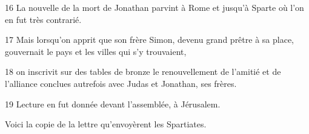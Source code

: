 16 La nouvelle de la mort de Jonathan parvint à Rome et jusqu’à Sparte où l’on en fut très contrarié.

17 Mais lorsqu’on apprit que son frère Simon, devenu grand prêtre à sa place, gouvernait le pays et les villes qui s’y trouvaient,

18 on inscrivit sur des tables de bronze le renouvellement de l’amitié et de l’alliance conclues autrefois avec Judas et Jonathan, ses frères.

19 Lecture en fut donnée devant l’assemblée, à Jérusalem.

Voici la copie de la lettre qu’envoyèrent les Spartiates.